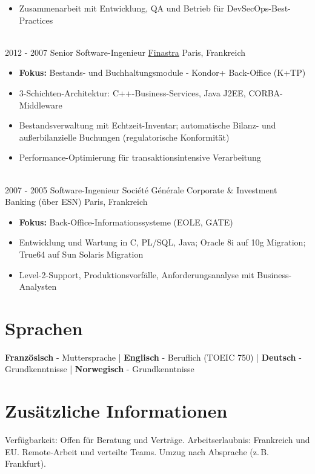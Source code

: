 \documentclass[letterpaper]{twentysecondcv} %
\begin{document}
\begin{twentytimeline}
{\begin{itemize}
		\item Zusammenarbeit mit Entwicklung, QA und Betrieb für DevSecOps-Best-Practices
		\end{itemize}}
	\\
	\twentyitemtimeline{\faCode}
		{2012 -}
		{2007}
		{Senior Software-Ingenieur}
		{\href{https://finastra.com}{Finastra}}
		{Paris, Frankreich}
		{\begin{itemize}
		\item \textbf{Fokus:} Bestands- und Buchhaltungsmodule - Kondor+ Back-Office (K+TP)
		\item 3-Schichten-Architektur: C++-Business-Services, Java J2EE, CORBA-Middleware
		\item Bestandsverwaltung mit Echtzeit-Inventar; automatische Bilanz- und außerbilanzielle Buchungen (regulatorische Konformität)
		\item Performance-Optimierung für transaktionsintensive Verarbeitung
		\end{itemize}}
	\\
	\twentyitemtimeline{\faBriefcase}
		{2007 -}
		{2005}
		{Software-Ingenieur}
		{Société Générale Corporate \& Investment Banking (über ESN)}
		{Paris, Frankreich}
		{\begin{itemize}
		\item \textbf{Fokus:} Back-Office-Informationssysteme (EOLE, GATE)
		\item Entwicklung und Wartung in C, PL/SQL, Java; Oracle 8i auf 10g Migration; True64 auf Sun Solaris Migration
		\item Level-2-Support, Produktionsvorfälle, Anforderungsanalyse mit Business-Analysten
		\end{itemize}}
\end{twentytimeline}


\section{Sprachen}

\textbf{Französisch} - Muttersprache | \textbf{Englisch} - Beruflich (TOEIC 750) | \textbf{Deutsch} - Grundkenntnisse | \textbf{Norwegisch} - Grundkenntnisse

\section{Zusätzliche Informationen}

Verfügbarkeit: Offen für Beratung und Verträge. Arbeitserlaubnis: Frankreich und EU. Remote-Arbeit und verteilte Teams. Umzug nach Absprache (z.\,B. Frankfurt).

\end{document}

